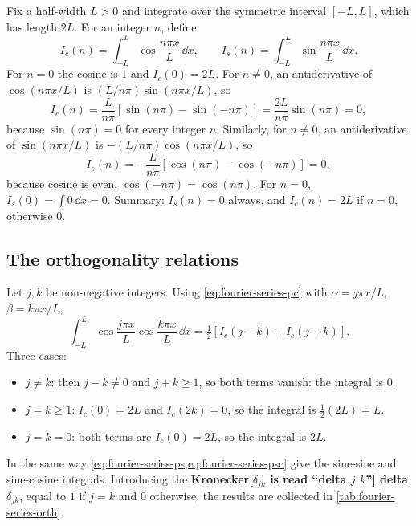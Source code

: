 Fix a half-width $L>0$ and integrate over the symmetric interval $[-L,L]$, which has length $2L$. For an integer $n$, define
\begin{equation}
I_c(n)=\int_{-L}^{L}\cos\frac{n\pi x}{L}\,\dd x,\qquad I_s(n)=\int_{-L}^{L}\sin\frac{n\pi x}{L}\,\dd x .
\end{equation}
For $n=0$ the cosine is $1$ and $I_c(0)=2L$. For $n\ne0$, an antiderivative of $\cos(n\pi x/L)$ is $(L/n\pi)\sin(n\pi x/L)$, so
\begin{equation}
I_c(n)=\frac{L}{n\pi}\left[\sin(n\pi)-\sin(-n\pi)\right]=\frac{2L}{n\pi}\sin(n\pi)=0,
\end{equation}
because $\sin(n\pi)=0$ for every integer $n$. Similarly, for $n\neq0$, an antiderivative of $\sin(n\pi x/L)$ is $-(L/n\pi)\cos(n\pi x/L)$, so
\begin{equation}
I_s(n)=-\frac{L}{n\pi}\left[\cos(n\pi)-\cos(-n\pi)\right]=0,
\end{equation}
because cosine is even, $\cos(-n\pi)=\cos(n\pi)$. For $n=0$, $I_s(0)=\int 0\,\dd x=0$. Summary: $I_s(n)=0$ always, and $I_c(n)=2L$ if $n=0$, otherwise $0$.

\subsection{The orthogonality relations}

Let $j,k$ be non-negative integers. Using \cref{eq:fourier-series-pc} with $\alpha=j\pi x/L$, $\beta=k\pi x/L$,
\begin{equation}
\int_{-L}^{L}\cos\frac{j\pi x}{L}\cos\frac{k\pi x}{L}\,\dd x=\tfrac12\left[I_c(j-k)+I_c(j+k)\right].
\end{equation}
Three cases:
\begin{itemize}
\item $j\ne k$: then $j-k\neq0$ and $j+k\ge1$, so both terms vanish: the integral is $0$.
\item $j=k\ge1$: $I_c(0)=2L$ and $I_c(2k)=0$, so the integral is $\tfrac12(2L)=L$.
\item $j=k=0$: both terms are $I_c(0)=2L$, so the integral is $2L$.
\end{itemize}
In the same way \cref{eq:fourier-series-ps,eq:fourier-series-psc} give the sine-sine and sine-cosine integrals. Introducing the \textbf{Kronecker[$\delta_{jk}$ is read ``delta $j$ $k$''] delta} $\delta_{jk}$, equal to $1$ if $j=k$ and $0$ otherwise, the results are collected in \cref{tab:fourier-series-orth}.

